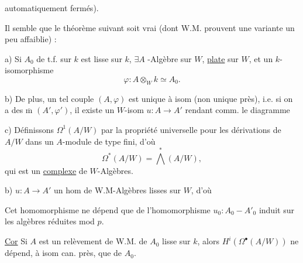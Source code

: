 

automatiquement fermés). 

Il semble que le théorème suivant soit vrai (dont W.M. prouvent une variante un peu affaiblie) :

a) Si $A_0$ de t.f. sur $k$ est lisse sur $k$, $\exists A$ -Algèbre sur $W$, \uline{plate} sur $W$, et un $k$-isomorphisme
\[
\varphi:A\otimes_W k\simeq A_0.
\]

b) De plus, un tel couple $(A,\varphi)$ est unique à isom (non unique près), i.e. si on a des  $\overline{\mathrm m}$ $(A',\varphi')$, il existe un $W$-isom $u:A\longrightarrow A'$ rendant comm. le diagramme


c) Définissons  $\Omega^1(A/W)$ par la propriété universelle pour les dérivations de $A/W$ dans un $A$-module de type fini, d'où
\[
\Omega^*(A/W)=\bigwedge^*(A/W),
\]
qui est un \uline{complexe} de $W$-Algèbres.





b) $u:A\longrightarrow A'$ un hom de W.M-Algèbres lisses sur $W$, d'où



Cet homomorphisme ne dépend que de l'homomorphisme $u_0:A_0-A'_0$ induit sur les algèbres réduites mod $p$.

\uline{Cor} Si $A$ est un relèvement de W.M.  de $A_0$ lisse sur $k$, alors $H^i(\Omega^\bullet(A/W))$ ne dépend, à isom can. près, que de $A_0$.

